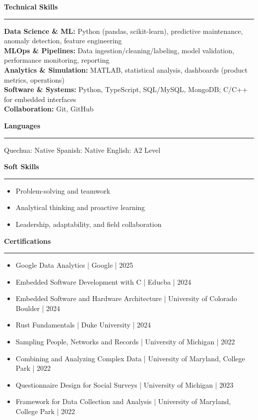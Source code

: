 \documentclass[11pt,letterpaper]{article}
\newcommand{\resumesection}[1]{
    \vspace{0.5em}
    \noindent\textbf{#1}
    \vspace{0.2em}
    \hrule
    \vspace{0.3em}
}
\begin{document}
\resumesection{Technical Skills}

\textbf{Data Science \& ML:} Python (pandas, scikit-learn), predictive maintenance, anomaly detection, feature engineering \\
\textbf{MLOps \& Pipelines:} Data ingestion/cleaning/labeling, model validation, performance monitoring, reporting \\
\textbf{Analytics \& Simulation:} MATLAB, statistical analysis, dashboards (product metrics, operations) \\
\textbf{Software \& Systems:} Python, TypeScript, SQL/MySQL, MongoDB; C/C++ for embedded interfaces \\
\textbf{Collaboration:} Git, GitHub

\resumesection{Languages}

Quechua: Native \hfill Spanish: Native \hfill English: A2 Level

\resumesection{Soft Skills}

\begin{itemize}[leftmargin=*,topsep=0pt,itemsep=2pt]
    \item Problem-solving and teamwork
    \item Analytical thinking and proactive learning
    \item Leadership, adaptability, and field collaboration
\end{itemize}

\resumesection{Certifications}

\begin{itemize}[leftmargin=*,topsep=0pt,itemsep=2pt]
    \item Google Data Analytics | Google | 2025
    \item Embedded Software Development with C | Educba | 2024
    \item Embedded Software and Hardware Architecture | University of Colorado Boulder | 2024
    \item Rust Fundamentals | Duke University | 2024
    \item Sampling People, Networks and Records | University of Michigan | 2022
    \item Combining and Analyzing Complex Data | University of Maryland, College Park | 2022
    \item Questionnaire Design for Social Surveys | University of Michigan | 2023
    \item Framework for Data Collection and Analysis | University of Maryland, College Park | 2022
\end{itemize}
\end{document}
